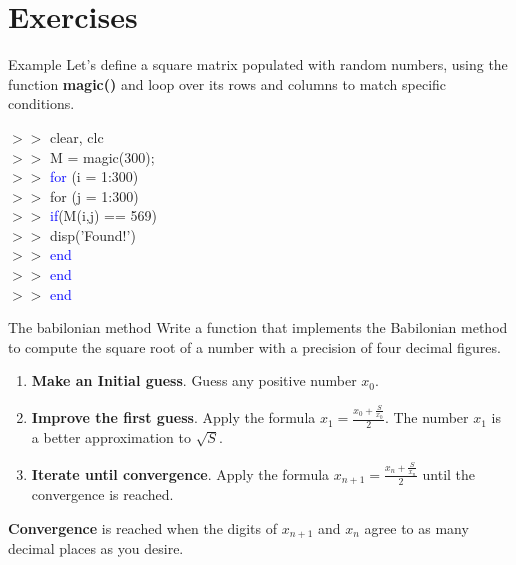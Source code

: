 \documentclass[xcolor={dvipsnames,rgb}, aspectratio=169]{beamer}
\begin{document}
\section{Exercises}
\begin{frame}{Example}
Let's define a square matrix populated with random numbers, using the function
\textbf{magic()} and loop over its rows and columns to match specific conditions.

\begin{tcolorbox}[colback=white,colframe=bluepoli]
   $>>$ clear, clc \\
   $>>$ M = magic(300);\\
   $>>$ \textcolor{blue}{for} (i = 1:300)\\
   $>>$ \hspace{1em}\color{blue} for \color{black} (j = 1:300)\\
   $>>$ \hspace{1em}\hspace{1em}\textcolor{blue}{if}(M(i,j) == 569)\\
   $>>$ \hspace{1em}\hspace{1em}\hspace{1em}disp('Found!')\\
   $>>$ \hspace{1em}\hspace{1em}\textcolor{blue}{end}\\
   $>>$ \hspace{1em}\textcolor{blue}{end}\\
   $>>$ \textcolor{blue}{end}
\end{tcolorbox}
\end{frame}

\begin{frame}{The babilonian method}
\textcolor{mylilas}{Write a function that implements the Babilonian method to compute the
   square root of a number with a precision of four decimal figures}.
\begin{enumerate}
   \item \textbf{Make an Initial guess}.
      Guess any positive number $x_{0}$.
   \item \textbf{Improve the first guess}.
      Apply the formula $x_{1} = \frac{x_{0} + \frac{S}{x_{0}}}{2}$. The number $x_{1}$
      is a better approximation to $\sqrt{S}$.
   \item \textbf{Iterate until convergence}.
      Apply the formula $x_{n+1} = \frac{x_{n} + \frac{S}{x_{n}}}{2}$ until the
      convergence is reached.
\end{enumerate}
\textbf{Convergence} is reached when the digits of $x_{n+1}$ and $x_{n}$ agree to as many
   decimal places as you desire.
\end{frame}
\end{document}
